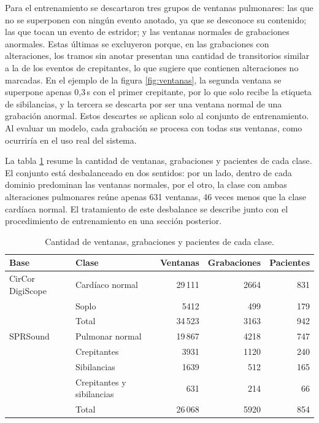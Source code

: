 Para el entrenamiento se descartaron tres grupos de ventanas pulmonares: las que no se superponen
con ningún evento anotado, ya que se desconoce su contenido; las que tocan un evento de estridor;
y las ventanas normales de grabaciones anormales. Estas últimas se excluyeron porque, en las
grabaciones con alteraciones, los tramos sin anotar presentan una cantidad de transitorios similar
a la de los eventos de crepitantes, lo que sugiere que contienen alteraciones no marcadas. En el
ejemplo de la figura \ref{fig:ventanas}, la segunda ventana se superpone apenas 0,3\,s con el
primer crepitante, por lo que solo recibe la etiqueta de sibilancias, y la tercera se descarta por
ser una ventana normal de una grabación anormal. Estos descartes se aplican solo al conjunto de
entrenamiento. Al evaluar un modelo, cada grabación se procesa con todas sus ventanas, como
ocurriría en el uso real del sistema.

La tabla \ref{tab:distribucionClases} resume la cantidad de ventanas, grabaciones y pacientes de
cada clase. El conjunto está desbalanceado en dos sentidos: por un lado, dentro de cada dominio predominan las
ventanas normales, por el otro, la clase con ambas alteraciones pulmonares reúne apenas 631 ventanas, 46
veces menos que la clase cardíaca normal. El tratamiento de este desbalance se describe junto con
el procedimiento de entrenamiento en una sección posterior.

\begin{table}[!htb]
	\centering
	\caption[Distribución de las clases]{Cantidad de ventanas, grabaciones y pacientes de cada
		clase.}
	\label{tab:distribucionClases}
	\small
	\begin{tabular}{l l r r r}
		\toprule
		\textbf{Base} & \textbf{Clase} & \textbf{Ventanas} & \textbf{Grabaciones} & \textbf{Pacientes} \\
		\midrule
		CirCor DigiScope & Cardíaco normal & 29\,111 & 2664 & 831 \\
		 & Soplo & 5412 & 499 & 179 \\
		 & Total & 34\,523 & 3163 & 942 \\
		\addlinespace
		SPRSound & Pulmonar normal & 19\,867 & 4218 & 747 \\
		 & Crepitantes & 3931 & 1120 & 240 \\
		 & Sibilancias & 1639 & 512 & 165 \\
		 & Crepitantes y sibilancias & 631 & 214 & 66 \\
		 & Total & 26\,068 & 5920 & 854 \\
		\bottomrule
	\end{tabular}
\end{table}

